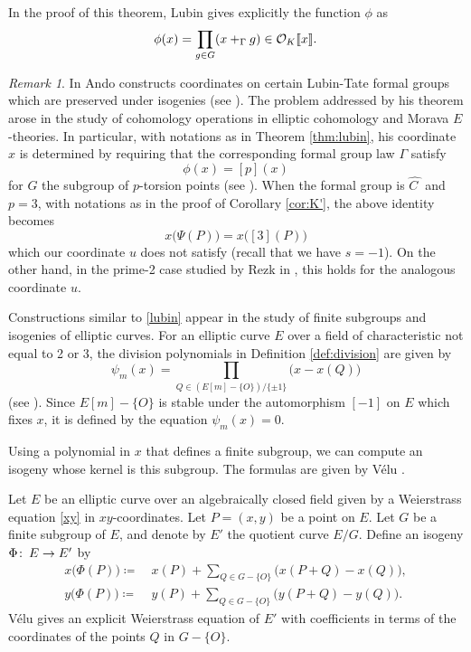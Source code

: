 \documentclass{gtpart}
\theoremstyle{definition}
\theoremstyle{remark}
\newtheorem{rmk}[thm]{Remark}
\def\co{\colon\thinspace}
\newcommand{\CO}{{\cal O}}
\newcommand{\HC}{\widehat{C~}\!}
\newcommand{\G}{\Gamma}
\newcommand{\ce}{\coloneqq}
\numberwithin{equation}{section}
\numberwithin{thm}{section}
\begin{document}
In the proof of this theorem, Lubin gives explicitly the function $\phi$ 
as 
\begin{equation}
\label{lubin}
 \phi(x) = \prod_{g \in G} (x +_\G g) \in \CO_K \llbracket x \rrbracket.  
\end{equation}

\begin{rmk}
 In \cite{Ando95} Ando constructs coordinates on certain Lubin-Tate 
 formal groups which are preserved under isogenies (see 
 \cite[Theorem 2.5.7]{Ando95}).  The problem addressed by his theorem 
 arose in the study of cohomology operations in elliptic cohomology and 
 Morava $E$-theories.  In particular, with notations as in Theorem 
 \ref{thm:lubin}, his coordinate $x$ is determined by requiring that the 
 corresponding formal group law $\G$ satisfy 
 \[
  \phi(x) = [p](x) 
 \]
 for $G$ the subgroup of $p$-torsion points (see 
 \cite[Theorem 2.6.4]{Ando95}).  When the formal group is $\HC$ and 
 $p=3$, with notations as in the proof of Corollary \ref{cor:K'}, the 
 above identity becomes 
 \[
  x\big( \Psi(P) \big) = x\big( [3](P) \big) 
 \]
 which our coordinate $u$ does not satisfy (recall that we have 
 $s = -1$).  On the other hand, in the prime-2 case studied by Rezk in 
 \cite{h2p2}, this holds for the analogous coordinate $u$.  
\end{rmk}

Constructions similar to \eqref{lubin} appear in the study of finite 
subgroups and isogenies of elliptic curves.  For an elliptic curve $E$ 
over a field of characteristic not equal to 2 or 3, the division 
polynomials in Definition \ref{def:division} are given by 
\begin{equation}
\label{division}
 \psi_m(x) = \prod_{Q \in (E[m]-\{O\}) / \{\pm1\}} \big( x - x(Q) \big) 
\end{equation}
(see \cite[13(9.2)]{husemoller}).  Since $E[m]-\{O\}$ is stable under 
the automorphism $[-1]$ on $E$ which fixes $x$, it is defined by the 
equation $\psi_m(x) = 0$.  

Using a polynomial in $x$ that defines a finite subgroup, we can compute 
an isogeny whose kernel is this subgroup.  The formulas are given by 
V\'elu \cite{velu}.  

Let $E$ be an elliptic curve over an algebraically closed field given by 
a Weierstrass equation \eqref{xy} in $xy$-coordinates.  Let $P = (x,y)$ 
be a point on $E$.  Let $G$ be a finite subgroup of $E$, and denote by 
$E'$ the quotient curve $E/G$.  Define an isogeny $\Phi \co E \to E'$ by 
\begin{equation}
\label{velu}
\begin{split}
 x \big( \Phi(P) \big) \ce & ~ x(P) + \sum_{Q \in G-\{O\}} \big( x(P+Q) - x(Q) \big), \\
 y \big( \Phi(P) \big) \ce & ~ y(P) + \sum_{Q \in G-\{O\}} \big( y(P+Q) - y(Q) \big).  
\end{split}
\end{equation}
V\'elu gives an explicit Weierstrass equation of $E'$ with coefficients 
in terms of the coordinates of the points $Q$ in $G-\{O\}$.  
\end{document}
